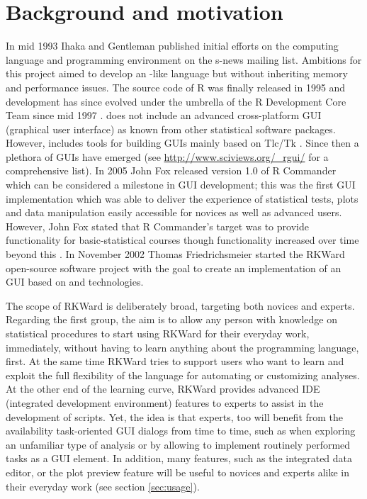 \section{Background and motivation}
\label{background}
In mid 1993 Ihaka and Gentleman published initial efforts on the computing
language and programming environment  on the s-news mailing list. Ambitions for
this project aimed to develop an -like language but without inheriting memory
and performance issues. The source code of R was finally released in 1995 and
development has since evolved under the umbrella of the R Development Core Team
since mid 1997 \citep{RDCT2001, RDCT2010, Ihaka_Gentlemen_1993}.
 does not include an advanced cross-platform GUI (graphical user interface) as known from other
statistical software packages. However,  includes tools for building GUIs
mainly based on Tlc/Tk \citep{Dalgaard2001, Dalgaard2002}. Since then a
plethora of  GUIs have emerged (see \url{http://www.sciviews.org/_rgui/} for a
comprehensive list). In 2005 John Fox released version 1.0 of R Commander which
can be considered a milestone in  GUI development; this was the first GUI
implementation which was able to deliver the experience of statistical tests,
plots and data manipulation easily accessible for  novices as well as advanced
users. However, John Fox stated that R Commander's target was to provide
functionality for basic-statistical courses though functionality increased over
time beyond this \citep{Fox2005}. In November 2002 Thomas Friedrichsmeier
started the RKWard open-source software project with the goal to create an
implementation of an  GUI based on  and  technologies.

The scope of RKWard is deliberately broad, targeting both  novices and experts.
Regarding the first group, the aim is to allow any person with knowledge on
statistical procedures to start using RKWard for their everyday work,
immediately, without having to learn anything about the  programming language,
first. At the same time RKWard tries to support users who want to learn and
exploit the full flexibility of the  language for automating or customizing
analyses. At the other end of the learning curve, RKWard provides advanced IDE (integrated development environment)
features to  experts to assist in the development of  scripts. Yet, the idea
is that  experts, too will benefit from the availability task-oriented GUI
dialogs from time to time, such as when exploring an unfamiliar type of analysis
or by allowing to implement routinely performed tasks as a GUI element. In
addition, many features, such as the integrated data editor, or the plot preview
feature will be useful to  novices and  experts alike in their everyday work
(see section \ref{sec:usage}).

